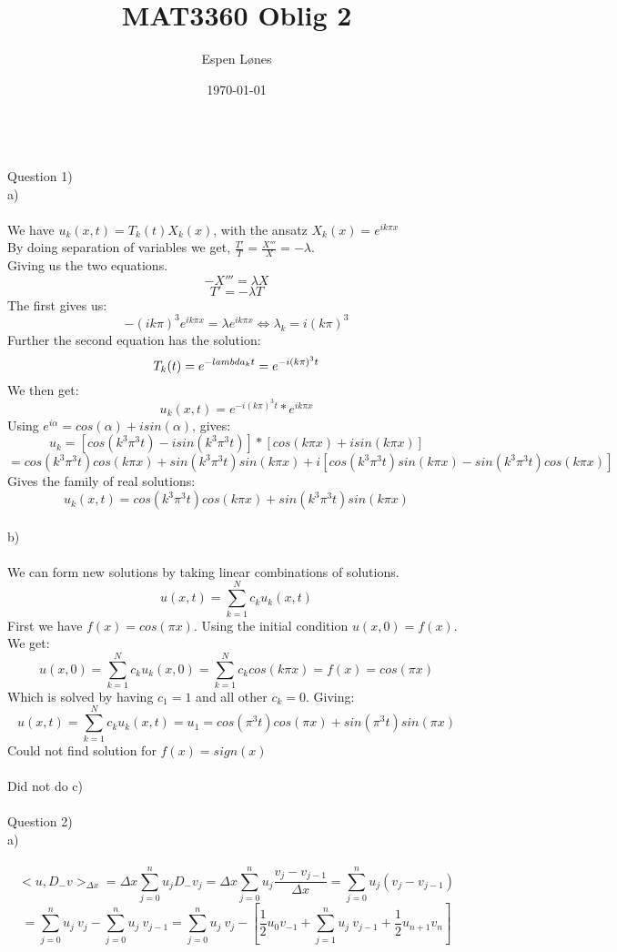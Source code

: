 \documentclass[12pt, letterpaper, twoside]{article}
\begin{document}
\title{MAT3360 Oblig 2}
\author{Espen Lønes}
\date{\today}
\maketitle
\ \\
Question 1)\\
a)\\
\ \\
We have $u_k(x,t) = T_k(t)X_k(x)$, with the ansatz $X_k(x) = e^{ik\pi x}$\\
By doing separation of variables we get, $\frac{T'}{T} = \frac{X'''}{X} = -\lambda$.\\
Giving us the two equations.
$$
-X''' = \lambda X
$$
$$
T' = -\lambda T
$$
The first gives us:
$$
-(ik\pi)^3 e^{ik\pi x} = \lambda e^{ik\pi x}
\iff
\lambda_k = i(k\pi)^3
$$
Further the second equation has the solution:
$$
T_k(t) = e^{-\\lambda_k t} = e^{-i(k\pi)^3t}
$$
We then get:
$$
u_k(x,t) = e^{-i(k\pi)^3t} * e^{ik\pi x}
$$
Using $e^{i\alpha} = cos(\alpha) + isin(\alpha)$, gives:
$$
u_k = [cos(k^3\pi^3t) - i sin(k^3\pi^3t)] * [cos(k\pi x) + i sin(k\pi x)]
$$
$$
=
cos(k^3\pi^3t) cos(k\pi x) + sin(k^3\pi^3t) sin(k\pi x)
+ i[cos(k^3\pi^3t)sin(k\pi x) - sin(k^3\pi^3t)cos(k\pi x)]
$$
Gives the family of real solutions:
$$
u_k(x,t) = cos(k^3\pi^3t) cos(k\pi x) + sin(k^3\pi^3t) sin(k\pi x)
$$
\newpage
\ \\
b)\\
\ \\
We can form new solutions by taking linear combinations of solutions.
$$
u(x,t) = \sum_{k=1}^N c_k u_k(x,t)
$$
First we have $f(x) = cos(\pi x)$. Using the initial condition $u(x,0) = f(x)$. We get:
$$
u(x,0) = \sum_{k=1}^N c_k u_k(x,0)
= \sum_{k=1}^N c_k cos(k\pi x)
= f(x) = cos(\pi x)
$$
Which is solved by having $c_1 = 1$ and all other $c_k = 0$. Giving:
$$
u(x,t) = \sum_{k=1}^N c_k u_k(x,t) = u_1 = cos(\pi^3t) cos(\pi x) + sin(\pi^3t) sin(\pi x)
$$
Could not find solution for $f(x) = sign(x)$\\
\ \\
Did not do c)\\
\newpage
\ \\
Question 2)\\
a)\\
\ \\
$$
<u, D_-v>_{\Delta x}
=
\Delta x \sum_{j=0}^n u_j D_-v_j
=
\Delta x \sum_{j=0}^n u_j \frac{v_j - v_{j-1}}{\Delta x}
=
\sum_{j=0}^n u_j (v_j - v_{j-1})
$$
$$
=
\sum_{j=0}^n u_j\ v_j - \sum_{j=0}^n u_j\ v_{j-1}
=
\sum_{j=0}^n u_j\ v_j - [ \frac{1}{2}u_0v_{-1} + \sum_{j=1}^n u_j\ v_{j-1} + \frac{1}{2}u_{n+1}v_{n}]
$$
\end{document}
